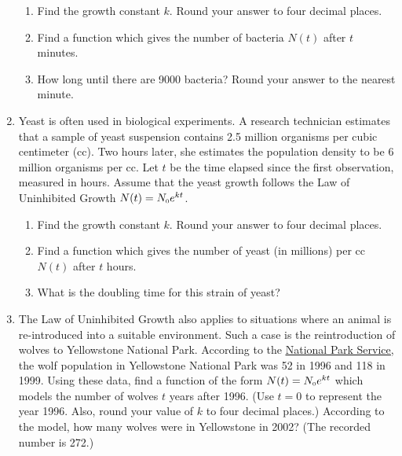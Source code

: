\begin{enumerate}
\begin{enumerate}

\item  Find the growth constant $k$. Round your answer to four decimal places.

\item  Find a function which gives the number of bacteria $N(t)$ after $t$ minutes.

\item  How long until there are 9000 bacteria?  Round your answer to the nearest minute.

\end{enumerate}

\item  Yeast is often used in biological experiments.  A research technician estimates that a sample of yeast suspension contains 2.5 million organisms per cubic centimeter (cc).  Two hours later, she estimates the population density to be 6 million organisms per cc.  Let $t$ be the time elapsed since the first observation, measured in hours.  Assume that the yeast growth follows the Law of Uninhibited Growth $N(t) = N_{\text{\tiny $0$}} e^{kt}$.

\begin{enumerate}

\item  Find the growth constant $k$. Round your answer to four decimal places.

\item  Find a function which gives the number of yeast (in millions) per cc $N(t)$ after $t$ hours.

\item  What is the doubling time for this strain of yeast?

\end{enumerate}


\item  The Law of Uninhibited Growth also applies to situations where an animal is re-introduced into a suitable environment.  Such a case is the reintroduction of wolves to Yellowstone National Park.   According to the \href{http://www.nps.gov/yell/naturescience/wolves.htm}{\underline{National Park Service}}, the wolf population in Yellowstone National Park was 52 in 1996 and 118 in 1999.  Using these data, find a function of the form $N(t) = N_{\text{\tiny $0$}} e^{kt}$  which models the number of wolves $t$ years after 1996.  (Use $t = 0$ to represent the year 1996.  Also, round your value of $k$ to four decimal places.)  According to the model, how many wolves were in Yellowstone in 2002?  (The recorded number is 272.)


\end{enumerate}
